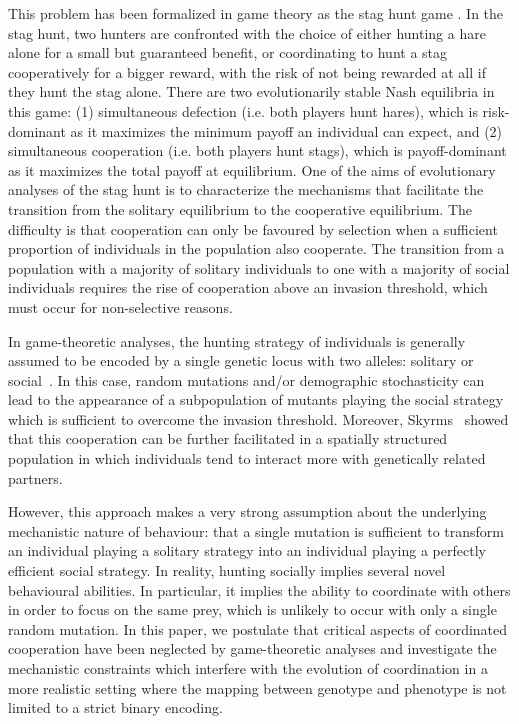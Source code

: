     This problem has been formalized in game theory as the stag hunt game \parencite{Skyrms2004}. In the stag hunt, two hunters are confronted with the choice of either hunting a hare alone for a small but guaranteed benefit, or coordinating to hunt a stag cooperatively for a bigger reward, with the risk of not being rewarded at all if they hunt the stag alone. There are two evolutionarily stable Nash equilibria in this game: (1) simultaneous defection (i.e. both players hunt hares), which is risk-dominant as it maximizes the minimum payoff an individual can expect, and (2) simultaneous cooperation (i.e. both players hunt stags), which is payoff-dominant as it maximizes the total payoff at equilibrium. One of the aims of evolutionary analyses of the stag hunt is to characterize the mechanisms that facilitate the transition from the solitary equilibrium to the cooperative equilibrium. The difficulty is that cooperation can only be favoured by selection when a sufficient proportion of individuals in the population also cooperate. The transition from a population with a majority of solitary individuals to one with a majority of social individuals requires the rise of cooperation above an invasion threshold, which must occur for non-selective reasons.

    In game-theoretic analyses, the hunting strategy of individuals is generally assumed to be encoded by a single genetic locus with two alleles: solitary or social~\parencite{Skyrms2004}. In this case, random mutations and/or demographic stochasticity can lead to the appearance of a subpopulation of mutants playing the social strategy which is sufficient to overcome the invasion threshold. Moreover, Skyrms~\parencite{Skyrms2004} showed that this cooperation can be further facilitated in a spatially structured population in which individuals tend to interact more with genetically related partners. 

    However, this approach makes a very strong assumption about the underlying mechanistic nature of behaviour: that a single mutation is sufficient to transform an individual playing a solitary strategy into an individual playing a perfectly efficient social strategy. In reality, hunting socially implies several novel behavioural abilities. In particular, it implies the ability to coordinate with others in order to focus on the same prey, which is unlikely to occur with only a single random mutation. In this paper, we postulate that critical aspects of coordinated cooperation have been neglected by game-theoretic analyses and investigate the mechanistic constraints which interfere with the evolution of coordination in a more realistic setting where the mapping between genotype and phenotype is not limited to a strict binary encoding. 

